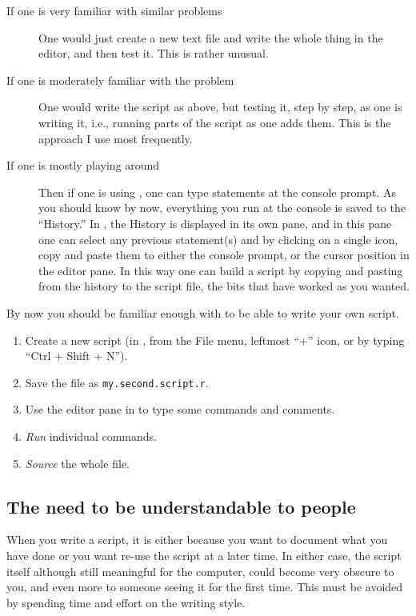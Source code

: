 \begin{description}
\item[If one is very familiar with similar problems] One would just create a new text file and write the whole thing in the editor, and then test it. This is rather unusual.
\item[If one is moderately familiar with the problem] One would write the script as above, but testing it, step by step, as one is writing it, i.e., running parts of the script as one adds them. This is the approach I use most frequently.
\item[If one is mostly playing around] Then if one is using \RStudio, one can type statements at the console prompt. As you should know by now, everything you run at the console is saved to the ``History.'' In \RStudio, the History is displayed in its own pane, and in this pane one can select any previous statement(s) and by clicking on a single icon, copy and paste them to either the \Rlang console prompt, or the cursor position in the editor pane. In this way one can build a script by copying and pasting from the history to the script file, the bits that have worked as you wanted.
\end{description}

\begin{playground}
By now you should be familiar enough with \Rlang to be able to write your own script.
\begin{enumerate}
  \item Create a new \Rpgrm script (in \RStudio, from the File menu, leftmost ``+'' icon, or by typing ``Ctrl + Shift + N'').
  \item Save the file as \texttt{my.second.script.r}.
  \item Use the editor pane in \RStudio to type some \Rpgrm commands and comments.
  \item \emph{Run} individual commands.
  \item \emph{Source} the whole file.
\end{enumerate}
\end{playground}

\subsection{The need to be understandable to people}\label{sec:script:readability}

When you write a script, it is either because you want to document what you have done or you want re-use the script at a later time. In either case, the script itself although still meaningful for the computer, could become very obscure to you, and even more to someone seeing it for the first time. This must be avoided by spending time and effort on the writing style.

